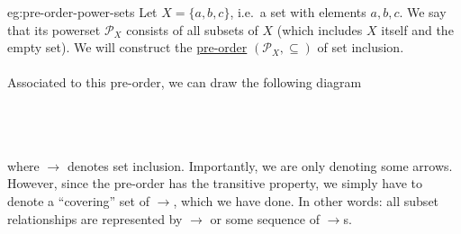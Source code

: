 \begin{eg}{eg:pre-order-power-sets}
    Let \( X = \{ a, b, c \} \), i.e.\ a set with elements \( a, b, c \).
    We say that its powerset \( \mathcal{P}_{X} \) consists of all subsets of \( X \) (which includes \( X \) itself and the empty set).
    We will construct the \hyperref[dfn:pre-order]{pre-order} \( (\mathcal{P}_{X}, \subseteq) \) of set inclusion.
    \\ \\
    Associated to this pre-order, we can draw the following diagram
    \\ \\
    \\ \\
    where \( \longrightarrow \) denotes set inclusion.
    Importantly, we are only denoting some arrows.
    However, since the pre-order has the transitive property, we simply have to denote a ``covering'' set of \( \longrightarrow \), which we have done.
    In other words: all subset relationships are represented by \( \longrightarrow \) or some sequence of \( \longrightarrow \)s.
\end{eg}


